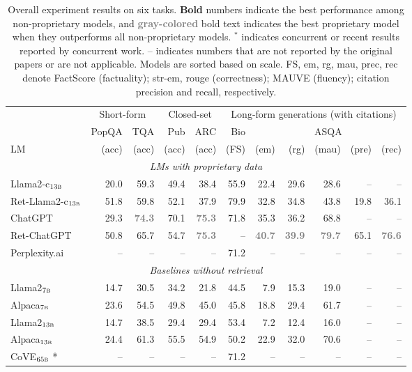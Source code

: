 \begin{table}[t!]
\centering
\footnotesize
    \caption{
    Overall experiment results on six tasks. {\bf Bold} numbers indicate the best performance among non-proprietary models, and \textcolor{gray}{\bf gray-colored} bold text indicates the best proprietary model when they outperforms all non-proprietary models.  
    $^*$ indicates concurrent or recent results reported by concurrent work.  -- indicates numbers that are not reported by the original papers or are not applicable. Models are sorted based on scale. FS, em, rg, mau, prec, rec denote FactScore (factuality); str-em, rouge (correctness); MAUVE (fluency); citation precision and recall, respectively. 
    }
    \label{tab:main}
\begin{tabular}{lrrrrrrrrrr}\toprule
&\multicolumn{2}{c}{Short-form} & \multicolumn{2}{c}{Closed-set} & \multicolumn{6}{c}{Long-form generations (with citations)}     \\
& PopQA & TQA &  Pub & ARC &  Bio  &\multicolumn{5}{c}{ASQA} \\ 
LM & (acc) & (acc) & (acc) & (acc) & (FS) & (em) & (rg) & (mau) & (pre) & (rec) \\
\midrule
\multicolumn{11}{c}{\it LMs with proprietary data } \\
Llama2-c$_{\textsc{13b}}$  & 20.0 & 59.3 & 49.4 & 38.4 & 55.9 & 22.4 & 29.6 & 28.6 & -- & -- \\
Ret-Llama2-c$_{\textsc{13b}}$  & 51.8  & 59.8& 52.1 & 37.9 &  {79.9} & 32.8 & 34.8 & 43.8 & 19.8& 36.1 \\
ChatGPT  & 29.3 &   \textcolor{gray}{\bf 74.3} & 70.1 &  \textcolor{gray}{\bf 75.3}  & 71.8 & 35.3  & 36.2  & 68.8 & -- & --\\ 
Ret-ChatGPT &  50.8 & 65.7 &  54.7 & \textcolor{gray}{\bf 75.3} & -- & \textcolor{gray}{\bf 40.7} &  \textcolor{gray}{\bf 39.9} & \textcolor{gray}{\bf 79.7} & {65.1} & \textcolor{gray}{\bf 76.6}  \\
Perplexity.ai &  -- & -- & -- & -- & 71.2 & -- &  -- & -- & -- &--  \\ \midrule
\multicolumn{11}{c}{\it Baselines without retrieval} \\
Llama2$_{\textsc{7b}}$ & 14.7 & 30.5 & 34.2 & 21.8  & 44.5  & 7.9 & 15.3&19.0 & -- & --  \\
Alpaca$_{\textsc{7b}}$  &  23.6 & 54.5  & 49.8 &45.0 & 45.8 & 18.8 & 29.4 & 61.7 & -- & --  \\
Llama2$_{\textsc{13b}}$   &  14.7 & 38.5  & 29.4 & 29.4 & 53.4 & 7.2 & 12.4 & 16.0  & -- & -- \\
Alpaca$_{\textsc{13b}}$ &  24.4  &  61.3  & 55.5  & 54.9 & 50.2 & 22.9 &  32.0&  70.6 & -- & -- \\
CoVE$_{\textsc{65b}}$ * &  -- & -- & -- & -- & 71.2  & --  & -- & -- & -- & -- \\  
\midrule


\end{tabular}
\end{table}
